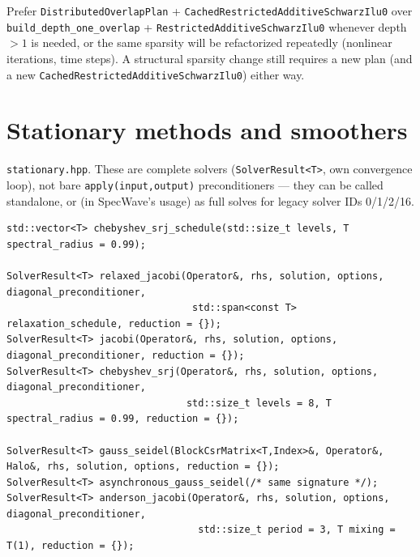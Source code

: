 \documentclass[11pt,a4paper]{report}
\begin{document}
Prefer \lstinline!DistributedOverlapPlan! + \lstinline!CachedRestrictedAdditiveSchwarzIlu0!
over \lstinline!build_depth_one_overlap! + \lstinline!RestrictedAdditiveSchwarzIlu0!
whenever depth $>1$ is needed, or the same sparsity will be
refactorized repeatedly (nonlinear iterations, time steps). A
structural sparsity change still requires a new plan (and a new
\lstinline!CachedRestrictedAdditiveSchwarzIlu0!) either way.

\section{Stationary methods and smoothers}
\label{sec:6.5}

\texttt{stationary.hpp}. These are complete solvers (\lstinline!SolverResult<T>!,
own convergence loop), not bare \lstinline!apply(input,output)! preconditioners
--- they can be called standalone, or (in SpecWave's usage) as full
solves for legacy solver IDs 0/1/2/16.

\begin{lstlisting}
std::vector<T> chebyshev_srj_schedule(std::size_t levels, T spectral_radius = 0.99);

SolverResult<T> relaxed_jacobi(Operator&, rhs, solution, options, diagonal_preconditioner,
                                std::span<const T> relaxation_schedule, reduction = {});
SolverResult<T> jacobi(Operator&, rhs, solution, options, diagonal_preconditioner, reduction = {});
SolverResult<T> chebyshev_srj(Operator&, rhs, solution, options, diagonal_preconditioner,
                               std::size_t levels = 8, T spectral_radius = 0.99, reduction = {});

SolverResult<T> gauss_seidel(BlockCsrMatrix<T,Index>&, Operator&, Halo&, rhs, solution, options, reduction = {});
SolverResult<T> asynchronous_gauss_seidel(/* same signature */);
SolverResult<T> anderson_jacobi(Operator&, rhs, solution, options, diagonal_preconditioner,
                                 std::size_t period = 3, T mixing = T(1), reduction = {});
\end{lstlisting}
\end{document}
